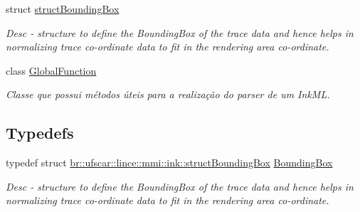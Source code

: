 \begin{DoxyCompactItemize}
struct \hyperlink{structbr_1_1ufscar_1_1lince_1_1mmi_1_1ink_1_1structBoundingBox}{structBoundingBox}
\begin{DoxyCompactList}\small\item\em Desc -\/ structure to define the BoundingBox of the trace data and hence helps in normalizing trace co-\/ordinate data to fit in the rendering area co-\/ordinate. \item\end{DoxyCompactList}\item 
class \hyperlink{classbr_1_1ufscar_1_1lince_1_1mmi_1_1ink_1_1GlobalFunction}{GlobalFunction}
\begin{DoxyCompactList}\small\item\em Classe que possui métodos úteis para a realização do parser de um InkML. \item\end{DoxyCompactList}\end{DoxyCompactItemize}
\subsection*{Typedefs}
\begin{DoxyCompactItemize}
\item 
typedef struct \hyperlink{structbr_1_1ufscar_1_1lince_1_1mmi_1_1ink_1_1structBoundingBox}{br::ufscar::lince::mmi::ink::structBoundingBox} \hyperlink{namespacebr_1_1ufscar_1_1lince_1_1mmi_1_1ink_aa98c72748d18ed23e3c98904db888f3d}{BoundingBox}
\begin{DoxyCompactList}\small\item\em Desc -\/ structure to define the BoundingBox of the trace data and hence helps in normalizing trace co-\/ordinate data to fit in the rendering area co-\/ordinate. \item\end{DoxyCompactList}\end{DoxyCompactItemize}
